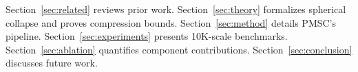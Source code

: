 Section~\ref{sec:related} reviews prior work. Section~\ref{sec:theory} formalizes spherical collapse and proves compression bounds. Section~\ref{sec:method} details PMSC's pipeline. Section~\ref{sec:experiments} presents 10K-scale benchmarks. Section~\ref{sec:ablation} quantifies component contributions. Section~\ref{sec:conclusion} discusses future work.

